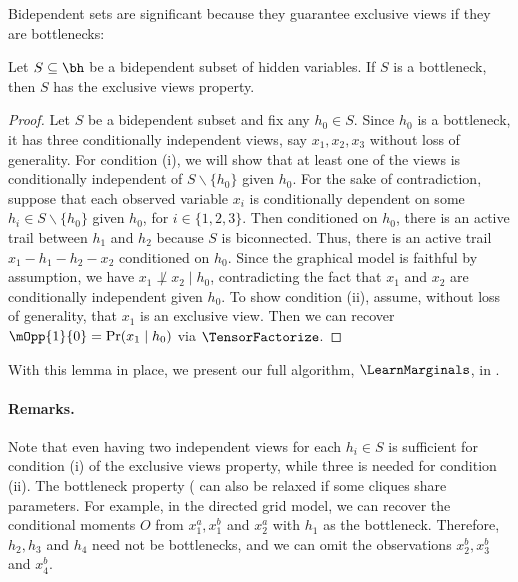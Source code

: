 Bidependent sets are significant because they guarantee exclusive views if they are bottlenecks:
\begin{lemma}
  \label{lem:bottleneck-views}  
  Let $S \subseteq \bh$ be a bidependent subset of hidden variables.
  If $S$ is a bottleneck, then $S$ has the exclusive views property.
\end{lemma}
\begin{proof}
Let $S$ be a bidependent subset and fix any $h_0 \in S$.
Since $h_0$ is a bottleneck, it has three conditionally independent views,
say $x_1, x_2, x_3$ without loss of generality. 
For condition (i), we will show that at least one of the views is conditionally independent
of $S \backslash \{ h_0 \}$ given $h_0$.
For the sake of contradiction, 
suppose that each observed variable $x_i$ is conditionally dependent on some
$h_i \in S \backslash \{h_0\}$ given $h_0$, for $i \in \{1, 2, 3\}$.
Then conditioned on $h_0$,
there is an active trail between $h_1$ and $h_2$ because $S$ is biconnected.
Thus, there is an active trail $x_1 - h_1 - h_2 - x_2$ conditioned on $h_0$.
Since the graphical model is faithful by assumption, we have $x_1 \not\perp x_2 \mid h_0$,
contradicting the fact that $x_1$ and $x_2$ are conditionally independent given $h_0$.
To show condition (ii), assume, without loss of generality, that $x_1$ is an exclusive view.
Then we can recover $\mOpp{1}{0} = \Pr(x_1 \mid h_0)$ via $\TensorFactorize$.
\end{proof}

With this lemma in place, we present our full algorithm, $\LearnMarginals$,
in .

\paragraph{Remarks.}
Note that even having two independent views for each $h_i \in S$ is sufficient for condition (i)
  of the exclusive views property, while three is needed for condition (ii).
The bottleneck property ( can also be relaxed if some cliques
  share parameters.
For example, in the directed grid model, we can recover the conditional moments $O$ from
  $x^a_1, x^b_1$ and $x^a_2$ with $h_1$ as the bottleneck.
  Therefore, $h_2, h_3$ and $h_4$
  need not be bottlenecks, and we can omit the observations $x^b_2, x^b_3$ and $x^b_4$.

